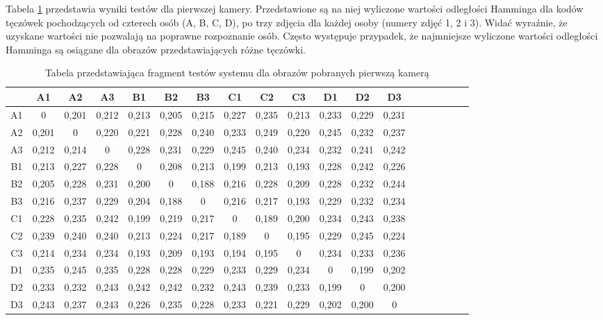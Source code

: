 Tabela \ref{tab:pierwsza} przedstawia wyniki testów dla pierwszej kamery. Przedstawione są na niej wyliczone wartości odległości Hamminga dla kodów tęczówek pochodzących od czterech osób (A, B, C, D), po trzy zdjęcia dla każdej osoby (numery zdjęć 1, 2 i 3). Widać wyraźnie, że uzyskane wartości nie pozwalają na poprawne rozpoznanie osób. Często występuje przypadek, że najmniejsze wyliczone wartości odległości Hamminga są osiągane dla obrazów przedstawiających różne tęczówki.

\begin{table}
\begin{center}
\caption{Tabela przedstawiająca fragment testów systemu dla obrazów pobranych pierwszą kamerą}
\label{tab:pierwsza}
\begin{tabular}{|c|c|c|c|c|c|c|c|c|c|c|c|c|c|c|c|c|c|c|}
\hline
 & A1 & A2 & A3 & B1 & B2 & B3 & C1 & C2 & C3 & D1 & D2 & D3\\ \hline
A1 & 0&0,201&0,212&0,213&0,205&0,215&0,227&0,235&0,213&0,233&0,229&0,231 \\ \hline
A2 & 0,201&0&0,220&0,221&0,228&0,240&0,233&0,249&0,220&0,245&0,232&0,237 \\ \hline
A3 & 0,212&0,214&0&0,228&0,231&0,229&0,245&0,240&0,234&0,232&0,241&0,242\\ \hline
B1 & 0,213&0,227&0,228&0&0,208&0,213&0,199&0,213&0,193&0,228&0,242&0,226\\ \hline
B2 & 0,205&0,228&0,231&0,200&0&0,188&0,216&0,228&0,209&0,228&0,232&0,244\\ \hline
B3 & 0,216&0,237&0,229&0,204&0,188&0&0,216&0,217&0,193&0,229&0,232&0,234\\ \hline
C1 & 0,228&0,235&0,242&0,199&0,219&0,217&0&0,189&0,200&0,234&0,243&0,238\\ \hline
C2 & 0,239&0,240&0,240&0,213&0,224&0,217&0,189&0&0,195&0,229&0,245&0,224\\ \hline
C3 & 0,214&0,234&0,234&0,193&0,209&0,193&0,194&0,195&0&0,234&0,233&0,236\\ \hline
D1 & 0,235&0,245&0,235&0,228&0,228&0,229&0,233&0,229&0,234&0&0,199&0,202\\ \hline
D2 & 0,233&0,232&0,243&0,242&0,242&0,232&0,243&0,239&0,233&0,199&0&0,200\\ \hline
D3 & 0,243&0,237&0,243&0,226&0,235&0,228&0,233&0,221&0,229&0,202&0,200&0\\ \hline
\end{tabular}
\end{center}
\end{table}

